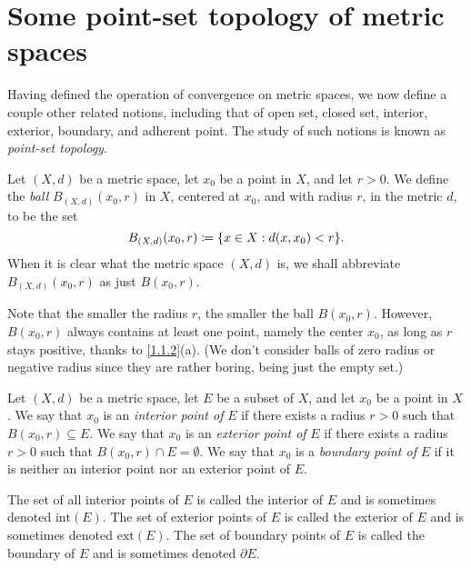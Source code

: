 \section{Some point-set topology of metric spaces}\label{sec:1.2}

\begin{note}
  Having defined the operation of convergence on metric spaces, we now define a couple other related notions, including that of open set, closed set, interior, exterior, boundary, and adherent point.
  The study of such notions is known as \emph{point-set topology}.
\end{note}

\begin{defn}[Balls]\label{1.2.1}
  Let \((X, d)\) be a metric space, let \(x_0\) be a point in \(X\), and let \(r > 0\).
  We define the \emph{ball} \(B_{(X, d)}(x_0, r)\) in \(X\), centered at \(x_0\), and with radius \(r\), in the metric \(d\), to be the set
  \[
    B_{(X, d)}(x_0, r) \coloneqq \set{x \in X : d(x, x_0) < r}.
  \]
  When it is clear what the metric space \((X, d)\) is, we shall abbreviate \(B_{(X, d)}(x_0, r)\) as just \(B(x_0, r)\).
\end{defn}

\setcounter{thm}{3}
\begin{rmk}\label{1.2.4}
  Note that the smaller the radius \(r\), the smaller the ball \(B(x_0 , r)\).
  However, \(B(x_0 , r)\) always contains at least one point, namely the center \(x_0\), as long as \(r\) stays positive, thanks to \cref{1.1.2}(a).
  (We don't consider balls of zero radius or negative radius since they are rather boring, being just the empty set.)
\end{rmk}

\begin{defn}\label{1.2.5}
  Let \((X, d)\) be a metric space, let \(E\) be a subset of \(X\), and let \(x_0\) be a point in \(X\).
  We say that \(x_0\) is an \emph{interior point of} \(E\) if there exists a radius \(r > 0\) such that \(B(x_0, r) \subseteq E\).
  We say that \(x_0\) is an \emph{exterior point of} \(E\) if there exists a radius \(r > 0\) such that \(B(x_0, r) \cap E = \emptyset\).
  We say that \(x_0\) is a \emph{boundary point of} \(E\) if it is neither an interior point nor an exterior point of \(E\).
\end{defn}

\begin{note}
  The set of all interior points of \(E\) is called the interior of \(E\) and is sometimes denoted \(\text{int}(E)\).
  The set of exterior points of \(E\) is called the exterior of \(E\) and is sometimes denoted \(\text{ext}(E)\).
  The set of boundary points of \(E\) is called the boundary of \(E\) and is sometimes denoted \(\partial E\).
\end{note}

